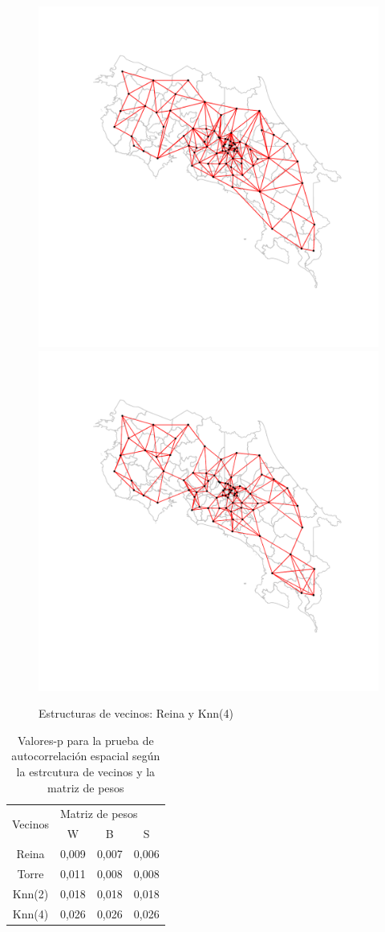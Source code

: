\documentclass[a4paper,12pt]{report}
\begin{document}
\begin{figure}[hbtp]
\centering
\includegraphics[width=.48\textwidth]{F21.pdf}
\includegraphics[width=.48\textwidth]{F22.pdf}
\caption{Estructuras de vecinos: Reina y Knn(4)}
\end{figure}

\begin{table}[h]
\centering
\caption{Valores-p para la prueba de autocorrelación espacial según la estrcutura de vecinos y la matriz de pesos}
\begin{tabular}{cccc}
\hline
\multirow{2}{*}{Vecinos} & \multicolumn{3}{l}{Matriz de pesos}\\ \cline{2-4} 
&W&B&S\\ \hline
Reina&0,009&0,007&0,006\\
Torre&0,011&0,008&0,008\\
Knn(2)&0,018&0,018&0,018\\
Knn(4)&0,026&0,026&0,026\\ \hline
\end{tabular}
\end{table}
\newpage
\end{document}
